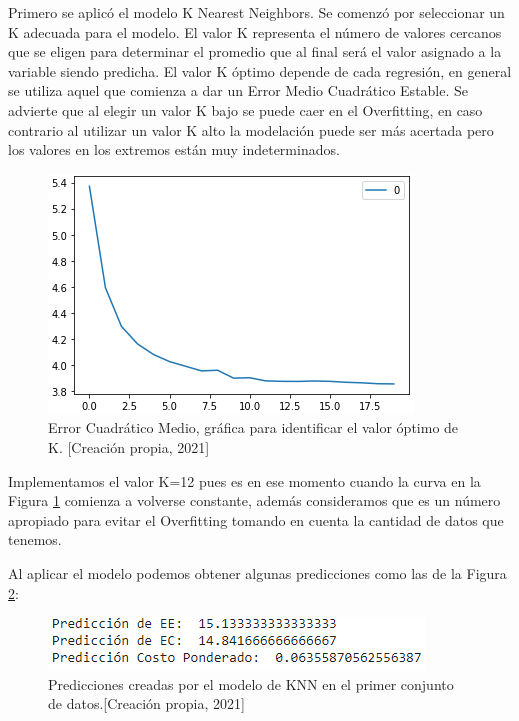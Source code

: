 \documentclass{article}
\begin{document}
Primero se aplicó el modelo K Nearest Neighbors. Se comenzó por seleccionar un K adecuada para el modelo. El valor K representa el número de valores cercanos que se eligen para determinar el promedio que al final será el valor asignado a la variable siendo predicha. El valor K óptimo depende de cada regresión, en general se utiliza aquel que comienza a dar un Error Medio Cuadrático Estable. Se advierte que al elegir un valor K bajo se puede caer en el Overfitting, en caso contrario al utilizar un valor K alto la modelación puede ser más acertada pero los valores en los extremos están muy indeterminados.\cite{Mille2019} 

\begin{figure}[!h]
    \centering
    \includegraphics[scale=.7]{F4/F4-im3.PNG}
    \caption{Error Cuadrático Medio, gráfica para identificar el valor óptimo de K. [Creación propia, 2021]}
    \label{fig:Codo1}
\end{figure}

Implementamos el valor K=12 pues es en ese momento cuando la curva en la Figura \ref{fig:Codo1} comienza a volverse constante, además consideramos que es un número apropiado para evitar el Overfitting tomando en cuenta la cantidad de datos que tenemos.
\pagebreak

Al aplicar el modelo podemos obtener algunas predicciones como las de la Figura \ref{fig:Prediccion1.1}: 

\begin{figure}[!h]
    \centering
    \includegraphics[scale=.7]{F4/F4-im4.PNG}
    \caption{Predicciones creadas por el modelo de KNN en el primer conjunto de datos.[Creación propia, 2021]}
    \label{fig:Prediccion1.1}
\end{figure}
\end{document}
